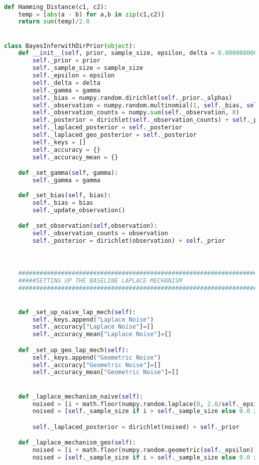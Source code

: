 \begin{lstlisting}[label=code-p1-2, language=Python, caption=Python Code For Bayesian Inference Class]

def Hamming_Distance(c1, c2):
	temp = [abs(a - b) for a,b in zip(c1,c2)]
	return sum(temp)/2.0


class BayesInferwithDirPrior(object):
	def __init__(self, prior, sample_size, epsilon, delta = 0.0000000001, gamma=1.0):
		self._prior = prior
		self._sample_size = sample_size
		self._epsilon = epsilon
		self._delta = delta
		self._gamma = gamma
		self._bias = numpy.random.dirichlet(self._prior._alphas)
		self._observation = numpy.random.multinomial(1, self._bias, self._sample_size)
		self._observation_counts = numpy.sum(self._observation, 0)
		self._posterior = dirichlet(self._observation_counts) + self._prior
		self._laplaced_posterior = self._posterior
		self._laplaced_geo_posterior = self._posterior
		self._keys = []
		self._accuracy = {}
		self._accuracy_mean = {}

	def _set_gamma(self, gamma):
		self._gamma = gamma
		
	def _set_bias(self, bias):
		self._bias = bias
		self._update_observation()

	def _set_observation(self,observation):
		self._observation_counts = observation
		self._posterior = dirichlet(observation) + self._prior



	##############################################################################
	#####SETTING UP THE BASELINE LAPLACE MECHANISM
	##############################################################################


	def _set_up_naive_lap_mech(self):
		self._keys.append("Laplace Noise")
		self._accuracy["Laplace Noise"]=[]
		self._accuracy_mean["Laplace Noise"]=[]

	def _set_up_geo_lap_mech(self):
		self._keys.append("Geometric Noise")
		self._accuracy["Geometric Noise"]=[]
		self._accuracy_mean["Geometric Noise"]=[]


	def _laplace_mechanism_naive(self):
		noised = [i + math.floor(numpy.random.laplace(0, 2.0/self._epsilon)) for i in self._observation_counts]
		noised = [self._sample_size if i > self._sample_size else 0.0 if i < 0.0 else i for i in noised]

		self._laplaced_posterior = dirichlet(noised) + self._prior

	def _laplace_mechanism_geo(self):
		noised = [i + math.floor(numpy.random.geometric(self._epsilon)) for i in self._observation_counts]
		noised = [self._sample_size if i > self._sample_size else 0.0 if i < 0.0 else i for i in noised]


\end{lstlisting}
